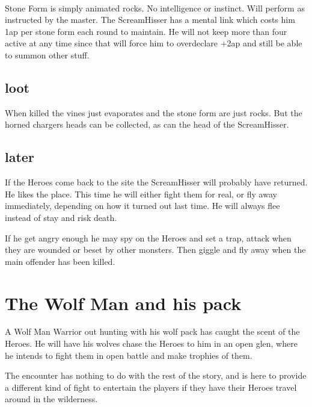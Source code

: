 \

Stone Form is simply animated rocks. No intelligence or instinct. Will perform as instructed by the master. The ScreamHisser has a mental link which costs him 1ap per stone form each round to maintain. He will not keep more than four active at any time since that will force him to overdeclare +2ap and still be able to summon other stuff.


\subsection*{loot}
When killed the vines just evaporates and the stone form are just rocks. But the horned chargers heads can be collected, as can the head of the ScreamHisser.


\subsection*{later}
If the Heroes come back to the site the ScreamHisser will probably have returned. He likes the place. This time he will either fight them for real, or fly away immediately, depending on how it turned out last time. He will always flee instead of stay and risk death.

If he get angry enough he may spy on the Heroes and set a trap, attack when they are wounded or beset by other monsters. Then giggle and fly away when the main offender has been killed.









\section*{The Wolf Man and his pack}
A Wolf Man Warrior out hunting with his wolf pack has caught the scent of the Heroes. He will have his wolves chase the Heroes to him in an open glen, where he intends to fight them in open battle and make trophies of them.

The encounter has nothing to do with the rest of the story, and is here to provide a different kind of fight to entertain the players if they have their Heroes travel around in the wilderness.


